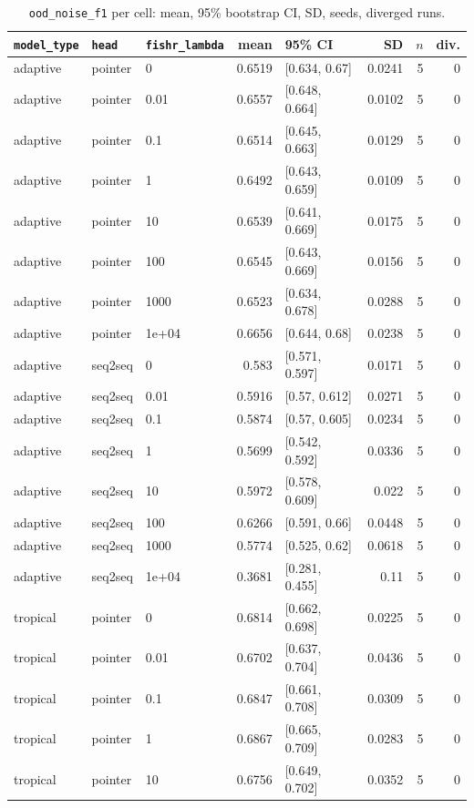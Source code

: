 \documentclass[10pt]{article}
\begin{document}
{\small
\begin{longtable}{lllrlrrr}
\caption{\texttt{ood\_noise\_f1} per cell: mean, 95\% bootstrap CI, SD, seeds, diverged runs.}\label{tab:summary-ood_noise_f1}\\
\toprule
\texttt{model\_type} & \texttt{head} & \texttt{fishr\_lambda} & mean & 95\% CI & SD & $n$ & div.\\
\midrule
\endhead
adaptive & pointer & 0 & 0.6519 & [0.634, 0.67] & 0.0241 & 5 & 0\\
adaptive & pointer & 0.01 & 0.6557 & [0.648, 0.664] & 0.0102 & 5 & 0\\
adaptive & pointer & 0.1 & 0.6514 & [0.645, 0.663] & 0.0129 & 5 & 0\\
adaptive & pointer & 1 & 0.6492 & [0.643, 0.659] & 0.0109 & 5 & 0\\
adaptive & pointer & 10 & 0.6539 & [0.641, 0.669] & 0.0175 & 5 & 0\\
adaptive & pointer & 100 & 0.6545 & [0.643, 0.669] & 0.0156 & 5 & 0\\
adaptive & pointer & 1000 & 0.6523 & [0.634, 0.678] & 0.0288 & 5 & 0\\
adaptive & pointer & 1e+04 & 0.6656 & [0.644, 0.68] & 0.0238 & 5 & 0\\
adaptive & seq2seq & 0 & 0.583 & [0.571, 0.597] & 0.0171 & 5 & 0\\
adaptive & seq2seq & 0.01 & 0.5916 & [0.57, 0.612] & 0.0271 & 5 & 0\\
adaptive & seq2seq & 0.1 & 0.5874 & [0.57, 0.605] & 0.0234 & 5 & 0\\
adaptive & seq2seq & 1 & 0.5699 & [0.542, 0.592] & 0.0336 & 5 & 0\\
adaptive & seq2seq & 10 & 0.5972 & [0.578, 0.609] & 0.022 & 5 & 0\\
adaptive & seq2seq & 100 & 0.6266 & [0.591, 0.66] & 0.0448 & 5 & 0\\
adaptive & seq2seq & 1000 & 0.5774 & [0.525, 0.62] & 0.0618 & 5 & 0\\
adaptive & seq2seq & 1e+04 & 0.3681 & [0.281, 0.455] & 0.11 & 5 & 0\\
tropical & pointer & 0 & 0.6814 & [0.662, 0.698] & 0.0225 & 5 & 0\\
tropical & pointer & 0.01 & 0.6702 & [0.637, 0.704] & 0.0436 & 5 & 0\\
tropical & pointer & 0.1 & 0.6847 & [0.661, 0.708] & 0.0309 & 5 & 0\\
tropical & pointer & 1 & 0.6867 & [0.665, 0.709] & 0.0283 & 5 & 0\\
tropical & pointer & 10 & 0.6756 & [0.649, 0.702] & 0.0352 & 5 & 0\\

\end{longtable}}
\end{document}
